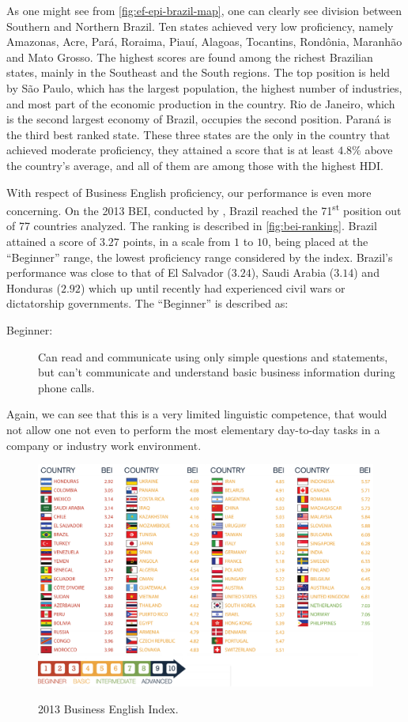 As one might see from \autoref{fig:ef-epi-brazil-map}, one can clearly see division between Southern and Northern Brazil. Ten states achieved very low proficiency, namely Amazonas, Acre, Par\'a, Roraima, Piau\'i, Alagoas, Tocantins, Rond\^onia, Maranh\~ao and Mato Grosso. The highest scores are found among the richest Brazilian states, mainly in the Southeast and the South regions. The top position is held by S\~ao Paulo, which has the largest population, the highest number of industries, and most part of the economic production in the country. Rio de Janeiro, which is the second largest economy of Brazil, occupies the second position. Paran\'a is the third best ranked state. These three states are the only in the country that achieved moderate proficiency, they attained a score that is at least $4.8\%$ above the country's average, and all of them are among those with the highest \ac{HDI}.

With respect of Business English proficiency, our performance is even more concerning. On the 
2013 \ac{BEI}, conducted by \citeauthor{BEI2013} \cite{BEI2013}, Brazil reached the 71\textsuperscript{st} position out of 77 countries analyzed. The ranking is described in \autoref{fig:bei-ranking}. Brazil attained a score of $3.27$ points, in a scale from $1$ to $10$, being placed at the ``Beginner'' range, the lowest proficiency range considered by the index. Brazil's performance was close to that of El Salvador ($3.24$), Saudi Arabia ($3.14$) and Honduras ($2.92$) which up until recently had experienced civil wars or dictatorship governments. The ``Beginner'' is described as:
\begin{description}
  \item[Beginner:] Can read and communicate using only simple questions and statements, but can't communicate and understand basic business information during phone calls.
\end{description}
Again, we can see that this is a very limited linguistic competence, that would not allow one not even to perform the most elementary day-to-day tasks in a company or industry work environment.

\begin{figure}[!htbp]
        \myfloatalign
        {\includegraphics[width=1.\linewidth]{gfx/bei-ranking-2013.pdf}}
        \caption{2013 Business English Index.}
        \label{fig:bei-ranking}
\end{figure}

